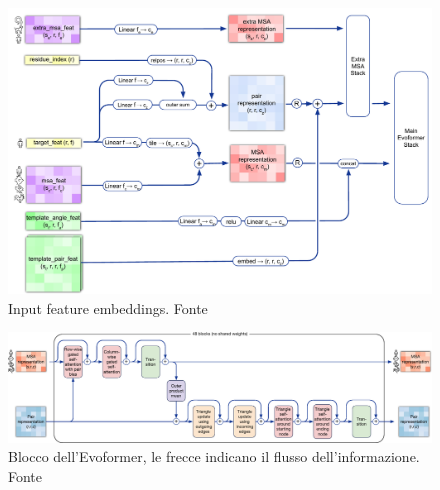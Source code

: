\begin{figure}[!htb]
	\centering
	\includegraphics[scale=0.46]{images/af2-input-embeddings.png}
	\caption{Input feature embeddings. Fonte\cite{supplementaryjumper2021highly}}
	\label{fig:af2-emebddings}
\end{figure}




\begin{figure}[!htb]
	\centering
	\includegraphics[scale=0.4]{images/evoformer.png}
	\caption{Blocco dell'Evoformer, le frecce indicano il flusso dell'informazione. Fonte\cite{jumper2021highly}}
	\label{fig:evoformer}
\end{figure}

\clearpage














